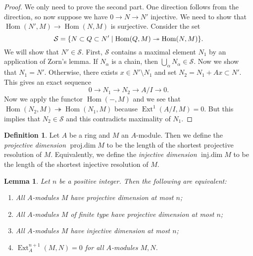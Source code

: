 \documentclass[leqno, openany]{memoir}
\newtheorem{lem}[thm]{Lemma}
\theoremstyle{definition}
\newtheorem{defn}[thm]{Definition}
\theoremstyle{remark}
\theoremstyle{plain}
\theoremstyle{definition}
\theoremstyle{remark}
\newcommand{\mc}[1]{\mathcal{#1}}
\DeclareMathOperator{\Hom}{Hom}
\DeclareMathOperator{\Ext}{Ext}
\begin{document}
\begin{proof} We only need to prove the second part. One direction follows from
    the direction, so now suppose we have $0 \to N \to N'$ injective. We need
    to show that $\Hom(N',M) \to \Hom(N,M)$ is surjective. Consider the set \[
    \mc{S} = \qty{N \subset Q \subset N' \mid \Hom(Q,M) \twoheadrightarrow
\Hom(N,M)}. \] We will show that $N' \in \mc{S}$. First, $\mc{S}$ contains a
maximal element $N_1$ by an application of Zorn's lemma. If $N_{\alpha}$ is a
chain, then $\bigcup_{\alpha} N_{\alpha} \in \mc{S}$. Now we show that $N_1 =
N'$. Otherwise, there exists $x \in N' \setminus N_1$ and set $N_2 = N_1 + Ax
\subset N'$. This gives an exact sequence \[ 0 \to N_1 \to N_2 \to A/I \to 0.
\] Now we apply the functor $\Hom(-,M)$ and we see that $\Hom(N_2, M)
\twoheadrightarrow \Hom(N_1, M)$ because $\Ext^1(A/I, M) = 0$. But this implies
that $N_2 \in \mc{S}$ and this contradicts maximality of $N_1$.  \end{proof}

\begin{defn} Let $A$ be a ring and $M$ an $A$-module. Then we define the
    \textit{projective dimension} $\operatorname{proj.dim} M$ to be the length
    of the shortest projective resolution of $M$. Equivalently, we define the
    \textit{injective dimension} $\operatorname{inj.dim} M$ to be the length of
    the shortest injective resolution of $M$.  \end{defn}

\begin{lem} Let $n$ be a positive integer. Then the following are equivalent:
    \begin{enumerate} \item All $A$-modules $M$ have projective dimension at
        most $n$; \item All $A$-modules $M$ of finite type have projective
        dimension at most $n$; \item All $A$-modules $M$ have injective
dimension at most $n$; \item $\Ext_A^{n+1}(M,N) = 0$ for all $A$-modules $M,N$.
\end{enumerate} \end{lem}
\end{document}
